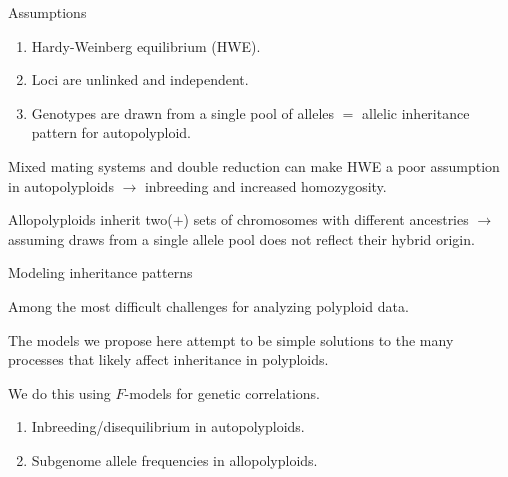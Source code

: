 \documentclass[presentation,sansserif]{beamer}
\begin{document}
\begin{frame}[t]{Assumptions}

  \begin{enumerate}
    \setlength\itemsep{0.25in}
    \item Hardy-Weinberg equilibrium (HWE).
    \item Loci are unlinked and independent.
    \item Genotypes are drawn from a single pool of alleles $=$ allelic inheritance pattern for autopolyploid.
  \end{enumerate}
  \vspace{0.25in}
  \pause

Mixed mating systems and double reduction can make HWE a poor assumption in autopolyploids \pause $\rightarrow$ inbreeding and increased homozygosity.
\vspace{0.25in}
\pause

Allopolyploids inherit two($+$) sets of chromosomes with different ancestries \pause $\rightarrow$ assuming draws from a single allele pool does not reflect their hybrid origin.

\end{frame}

\begin{frame}[t]{Modeling inheritance patterns}
\vspace{0.2in}
\pause

  Among the most difficult challenges for analyzing polyploid data.
  \vspace{0.3in}
  \pause
  
  The models we propose here attempt to be simple solutions to the many processes that likely affect inheritance in polyploids.
  \vspace{0.3in}
  \pause
  
  We do this using $F$-models for genetic correlations.
  \vspace{0.3in}
  \pause
  
  	\begin{enumerate}
		\item Inbreeding/disequilibrium in autopolyploids.
		\item Subgenome allele frequencies in allopolyploids.
	\end{enumerate}

\end{frame}
\end{document}
